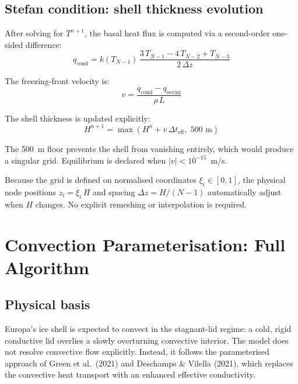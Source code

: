 \documentclass[11pt,a4paper]{article}
\begin{document}
\subsection{Stefan condition: shell thickness evolution}

After solving for $T^{n+1}$, the basal heat flux is computed via a
second-order one-sided difference:
\begin{equation}
q_{\mathrm{cond}} = k(T_{N-1})\,
  \frac{3\,T_{N-1} - 4\,T_{N-2} + T_{N-3}}{2\,\Delta z}
\label{eq:qcond_numerical}
\end{equation}

The freezing-front velocity is:
\begin{equation}
v = \frac{q_{\mathrm{cond}} - q_{\mathrm{ocean}}}{\rho\,L}
\end{equation}

The shell thickness is updated explicitly:
\begin{equation}
H^{n+1} = \max\!\left(H^n + v\,\Delta t_{\mathrm{eff}},\; 500\text{~m}\right)
\end{equation}

The 500~m floor prevents the shell from vanishing entirely, which
would produce a singular grid. Equilibrium is declared when
$|v| < 10^{-15}$~m/s.

Because the grid is defined on normalised coordinates
$\xi_i \in [0,1]$, the physical node positions $z_i = \xi_i\,H$
and spacing $\Delta z = H/(N{-}1)$ automatically adjust when $H$
changes. No explicit remeshing or interpolation is required.

\section{Convection Parameterisation: Full Algorithm}
\label{sec:convection}

\subsection{Physical basis}

Europa's ice shell is expected to convect in the stagnant-lid regime:
a cold, rigid conductive lid overlies a slowly overturning convective
interior. The model does not resolve convective flow explicitly.
Instead, it follows the parameterised approach of Green et al.\ (2021)
and Deschamps \& Vilella (2021), which replaces the convective heat
transport with an enhanced effective conductivity.
\end{document}
